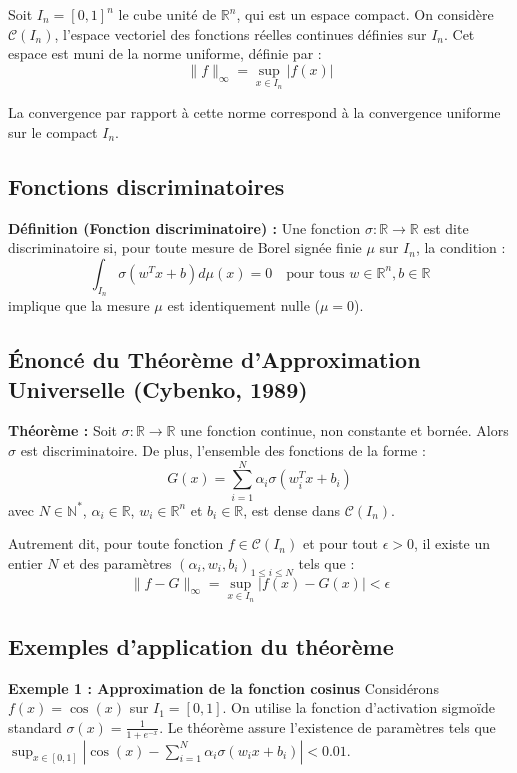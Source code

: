 \documentclass[11pt,a4paper]{article}
\begin{document}
Soit $I_n = [0, 1]^n$ le cube unité de $\mathbb{R}^n$, qui est un espace compact. On considère $\mathcal{C}(I_n)$, l'espace vectoriel des fonctions réelles continues définies sur $I_n$. Cet espace est muni de la norme uniforme, définie par :
$$\|f\|_\infty = \sup_{x \in I_n} |f(x)|$$

La convergence par rapport à cette norme correspond à la convergence uniforme sur le compact $I_n$.

\subsection{Fonctions discriminatoires}

\textbf{Définition (Fonction discriminatoire) :} Une fonction $\sigma : \mathbb{R} \to \mathbb{R}$ est dite discriminatoire si, pour toute mesure de Borel signée finie $\mu$ sur $I_n$, la condition :
$$\int_{I_n} \sigma(w^T x + b) d\mu(x) = 0 \quad \text{pour tous } w \in \mathbb{R}^n, b \in \mathbb{R}$$
implique que la mesure $\mu$ est identiquement nulle ($\mu = 0$).

\subsection{Énoncé du Théorème d'Approximation Universelle (Cybenko, 1989)}

\textbf{Théorème :} Soit $\sigma : \mathbb{R} \to \mathbb{R}$ une fonction continue, non constante et bornée. Alors $\sigma$ est discriminatoire. De plus, l'ensemble des fonctions de la forme :
$$G(x) = \sum_{i=1}^N \alpha_i \sigma(w_i^T x + b_i)$$
avec $N \in \mathbb{N}^*$, $\alpha_i \in \mathbb{R}$, $w_i \in \mathbb{R}^n$ et $b_i \in \mathbb{R}$, est dense dans $\mathcal{C}(I_n)$.

Autrement dit, pour toute fonction $f \in \mathcal{C}(I_n)$ et pour tout $\epsilon > 0$, il existe un entier $N$ et des paramètres $(\alpha_i, w_i, b_i)_{1 \le i \le N}$ tels que :
$$\|f - G\|_\infty = \sup_{x \in I_n} |f(x) - G(x)| < \epsilon$$

\subsection{Exemples d'application du théorème}

\textbf{Exemple 1 : Approximation de la fonction cosinus}
Considérons $f(x) = \cos(x)$ sur $I_1 = [0, 1]$. On utilise la fonction d'activation sigmoïde standard $\sigma(x) = \frac{1}{1 + e^{-x}}$. Le théorème assure l'existence de paramètres tels que $\sup_{x \in [0, 1]} |\cos(x) - \sum_{i=1}^N \alpha_i \sigma(w_i x + b_i)| < 0.01$.
\end{document}
